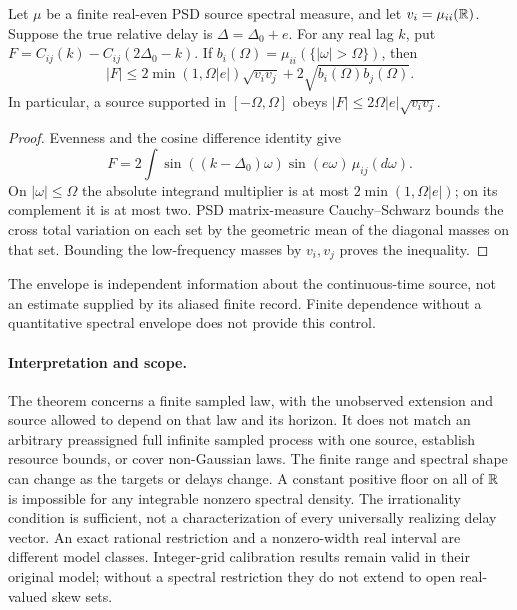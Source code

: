 \begin{proposition}
Let $\mu$ be a finite real-even PSD source spectral measure, and let
$v_i=\mu_{ii}(\mathbb R)$. Suppose the true relative delay is
$\Delta=\Delta_0+e$. For any real lag $k$, put
$F=C_{ij}(k)-C_{ij}(2\Delta_0-k)$. If
$b_i(\Omega)=\mu_{ii}(\{|\omega|>\Omega\})$, then
\[
 |F|\le 2\min(1,\Omega|e|)\sqrt{v_i v_j}
              +2\sqrt{b_i(\Omega)b_j(\Omega)}.
\]
In particular, a source supported in $[-\Omega,\Omega]$ obeys
$|F|\le2\Omega|e|\sqrt{v_i v_j}$.
\end{proposition}
\begin{proof}
Evenness and the cosine difference identity give
\[
 F=2\int\sin((k-\Delta_0)\omega)\sin(e\omega)\,\mu_{ij}(d\omega).
\]
On $|\omega|\le\Omega$ the absolute integrand multiplier is at most
$2\min(1,\Omega|e|)$; on its complement it is at most two.
PSD matrix-measure Cauchy--Schwarz bounds the cross total variation on
each set by the geometric mean of the diagonal masses on that set.
Bounding the low-frequency masses by $v_i,v_j$ proves the inequality.
\end{proof}
The envelope is independent information about the continuous-time
source, not an estimate supplied by its aliased finite record. Finite dependence
without a quantitative spectral envelope does not provide this control.

\paragraph{Interpretation and scope.}
The theorem concerns a finite sampled law, with the unobserved extension
and source allowed to depend on that law and its horizon. It does not
match an arbitrary preassigned full infinite sampled process with one
source, establish resource bounds, or cover non-Gaussian laws. The finite
range and spectral shape can change as the targets or delays change.
A constant positive floor on all of $\mathbb R$ is impossible for any integrable
nonzero spectral density. The irrationality condition is sufficient, not
a characterization of every universally realizing delay vector. An
exact rational restriction and a nonzero-width real interval are
different model classes. Integer-grid calibration results remain valid
in their original model; without a spectral restriction they do not
extend to open real-valued skew sets.
